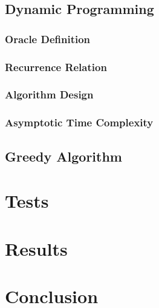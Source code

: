 \documentclass[conference]{IEEEtran}
\begin{document}
\subsection{Dynamic Programming}

\subsubsection{Oracle Definition}

\subsubsection{Recurrence Relation}

\subsubsection{Algorithm Design}

\subsubsection{Asymptotic Time Complexity}

\subsection{Greedy Algorithm}

\section{Tests}

\section{Results}


\section{Conclusion}



\end{document}
